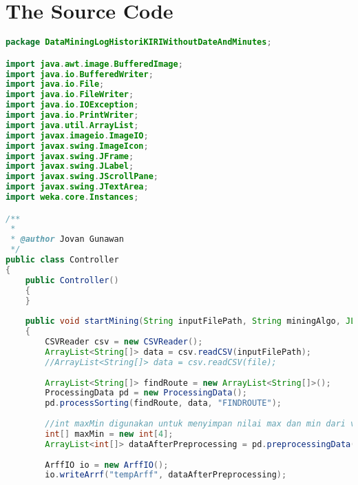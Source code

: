 \chapter{The Source Code}
\label{app:B}

\singlespacing 
%
%
\begin{lstlisting}[language=Java,basicstyle=\tiny,caption=Controller.java]
package DataMiningLogHistoriKIRIWithoutDateAndMinutes;

import java.awt.image.BufferedImage;
import java.io.BufferedWriter;
import java.io.File;
import java.io.FileWriter;
import java.io.IOException;
import java.io.PrintWriter;
import java.util.ArrayList;
import javax.imageio.ImageIO;
import javax.swing.ImageIcon;
import javax.swing.JFrame;
import javax.swing.JLabel;
import javax.swing.JScrollPane;
import javax.swing.JTextArea;
import weka.core.Instances;

/**
 *
 * @author Jovan Gunawan
 */
public class Controller
{
    public Controller()
    {
    }
    
    public void startMining(String inputFilePath, String miningAlgo, JLabel label, JTextArea textArea) throws IOException
    {
        CSVReader csv = new CSVReader();
        ArrayList<String[]> data = csv.readCSV(inputFilePath);
        //ArrayList<String[]> data = csv.readCSV(file);
        
        ArrayList<String[]> findRoute = new ArrayList<String[]>();
        ProcessingData pd = new ProcessingData();
        pd.processSorting(findRoute, data, "FINDROUTE");
        
        //int maxMin digunakan untuk menyimpan nilai max dan min dari variable bulan dan tahun. Untuk ketentuan posisi array dapat dilihat di method preprocessing data
        int[] maxMin = new int[4];
        ArrayList<int[]> dataAfterPreprocessing = pd.preprocessingData(findRoute, maxMin);
        
        ArffIO io = new ArffIO();
        io.writeArrf("tempArff", dataAfterPreprocessing);
        

\end{lstlisting}
